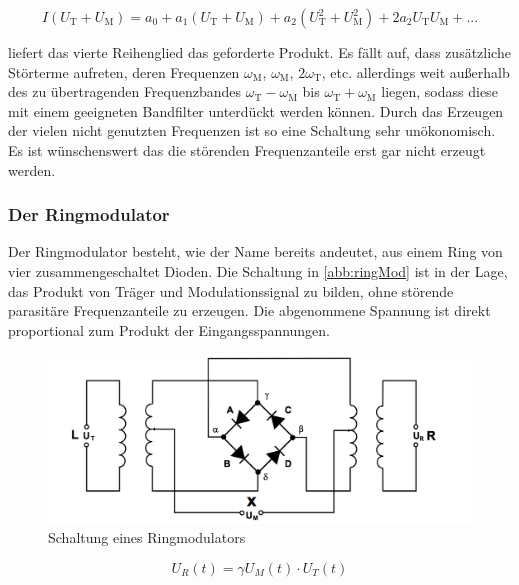\begin{equation}
I(U_\text{T} + U_\text{M}) = a_0 + a_1(U_\text{T} + U_\text{M}) + a_2(U_\text{T}^2 + U_\text{M}^2) + 2a_2 U_\text{T} U_\text{M} + ...
\end{equation}

\noindent liefert das vierte Reihenglied das geforderte Produkt. Es fällt auf, dass zusätzliche Störterme aufreten, deren Frequenzen  $\omega_\text{M}$, $\omega_\text{M}$, $2\omega_\text{T}$, etc. allerdings weit außerhalb des zu übertragenden Frequenzbandes $\omega_\text{T} - \omega_\text{M}$ bis $\omega_\text{T} + \omega_\text{M}$ liegen, sodass diese mit einem geeigneten Bandfilter unterdückt werden können.
Durch das Erzeugen der vielen nicht genutzten Frequenzen ist so eine Schaltung sehr unökonomisch. Es ist wünschenswert das die störenden Frequenzanteile erst gar nicht erzeugt werden.

\FloatBarrier

\subsubsection{Der Ringmodulator}
Der Ringmodulator besteht, wie der Name bereits andeutet, aus einem Ring von vier zusammengeschaltet Dioden. Die Schaltung in \autoref{abb:ringMod} ist in der Lage, das Produkt von Träger und Modulationssignal zu bilden, ohne störende parasitäre Frequenzanteile zu erzeugen. Die abgenommene Spannung ist direkt proportional zum Produkt der Eingangsspannungen.

\begin{figure}
	\centering
	\includegraphics[width=\textwidth]{img/Abb5.png}
	\caption{Schaltung eines Ringmodulators \cite{FP}}
	\label{abb:ringMod}
\end{figure}

\begin{equation}
U_R(t) = \gamma U_M(t) \cdot U_T(t)
\label{eq:ringMod}
\end{equation}


